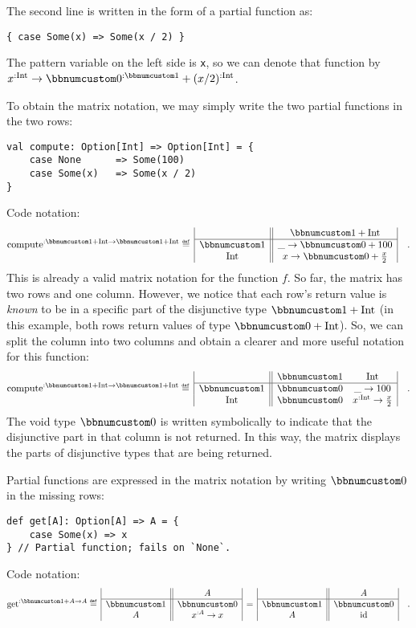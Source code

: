 The second line is written in the form of a partial function as:
\begin{lstlisting}
{ case Some(x) => Some(x / 2) }
\end{lstlisting}
The pattern variable on the left side is \lstinline!x!, so we can
denote that function by $x^{:\text{Int}}\rightarrow\bbnum 0^{:\bbnum 1}+(x/2)^{:\text{Int}}$. 

To obtain the matrix notation, we may simply write the two partial
functions in the two rows:
\begin{lstlisting}
val compute: Option[Int] => Option[Int] = {
    case None      => Some(100)
    case Some(x)   => Some(x / 2)
}
\end{lstlisting}
Code notation:
\[
\text{compute}^{:\bbnum 1+\text{Int}\rightarrow\bbnum 1+\text{Int}}\triangleq\,\begin{array}{|c||c|}
 & \bbnum 1+\text{Int}\\
\hline \bbnum 1 & \_\rightarrow\bbnum 0+100\\
\text{Int} & x\rightarrow\bbnum 0+\frac{x}{2}
\end{array}\quad.
\]
This is already a valid matrix notation for the function $f$. So
far, the matrix has two rows and one column. However, we notice that
each row\textsf{'}s return value is \emph{known} to be in a specific part of
the disjunctive type $\bbnum 1+\text{Int}$ (in this example, both
rows return values of type $\bbnum 0+\text{Int}$). So, we can split
the column into two columns and obtain a clearer and more useful notation
for this function:
\[
\text{compute}^{:\bbnum 1+\text{Int}\rightarrow\bbnum 1+\text{Int}}\triangleq\,\begin{array}{|c||cc|}
 & \bbnum 1 & \text{Int}\\
\hline \bbnum 1 & \bbnum 0 & \_\rightarrow100\\
\text{Int} & \bbnum 0 & x^{:\text{Int}}\rightarrow\frac{x}{2}
\end{array}\quad.
\]
The void type $\bbnum 0$ is
written symbolically to indicate that the disjunctive part in that
column is not returned. In this way, the matrix displays the parts
of disjunctive types that are being returned. 

Partial functions are expressed in the matrix notation by writing
$\bbnum 0$ in the missing rows:
\begin{lstlisting}
def get[A]: Option[A] => A = {
    case Some(x) => x
} // Partial function; fails on `None`.
\end{lstlisting}
Code notation:
\[
\text{get}^{:\bbnum 1+A\rightarrow A}\triangleq\,\begin{array}{|c||c|}
 & A\\
\hline \bbnum 1 & \bbnum 0\\
A & x^{:A}\rightarrow x
\end{array}\,=\,\begin{array}{|c||c|}
 & A\\
\hline \bbnum 1 & \bbnum 0\\
A & \text{id}
\end{array}\quad.
\]

